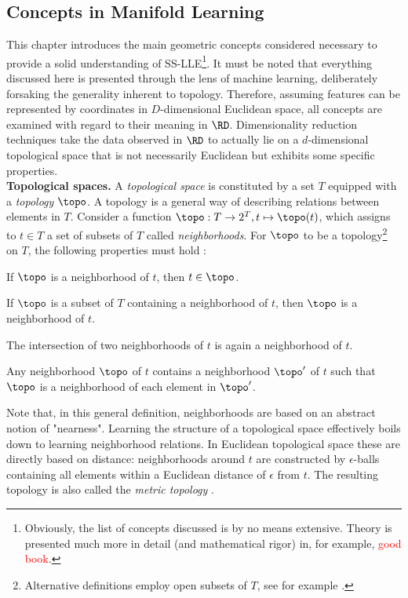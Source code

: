 \subsection{Concepts in Manifold Learning}
\label{mani-concepts}

This chapter introduces the main geometric concepts considered necessary to
provide a solid understanding of SS-LLE\footnote{
Obviously, the list of concepts discussed is by no means extensive. Theory is
presented much more in detail (and mathematical rigor) in, for example, 
\textcolor{red}{good book}.
}.
It must be noted that everything discussed here is presented through the lens of
machine learning, deliberately forsaking the generality inherent to topology.
Therefore, assuming features can be represented by coordinates in 
$D$-dimensional Euclidean space, all concepts are examined with regard to their
meaning in $\RD$.
Dimensionality reduction techniques take the data observed in $\RD$ to actually
lie on a $d$-dimensional topological space that is not necessarily Euclidean but
exhibits some specific properties.
\\


\textbf{Topological spaces.} A \textit{topological space} is constituted by a 
set $T$ equipped with a \textit{topology} $\topo$. 
A topology is a general way of describing relations between elements in $T$.
Consider a function $\topo: T \rightarrow 2^T, t \mapsto \topo(t)$, which 
assigns to $t \in T$ a set of subsets of $T$ called \textit{neighborhoods}.
For $\topo$ to be a topology\footnote{
Alternative definitions employ open subsets of $T$, see for example 
\citet{waldmann2014}.
}
on $T$, the following properties must hold \citep{brown2006}:
\begin{tight_enumerate}
  \item If $\topo$ is a neighborhood of $t$, then $t \in \topo$.
  \item If $\topo$ is a subset of $T$ containing a neighborhood of $t$, then 
  $\topo$ is a neighborhood of $t$.
  \item The intersection of two neighborhoods of $t$ is again a neighborhood of
  $t$.
  \item Any neighborhood $\topo$ of $t$ contains a neighborhood $\topo^{\prime}$ 
  of $t$ such that $\topo$ is a neighborhood of each element in 
  $\topo^{\prime}$.
\end{tight_enumerate}

Note that, in this general definition, neighborhoods are based on an abstract
notion of "nearness". 
Learning the structure of a topological space effectively boils down to learning 
neighborhood relations.
In Euclidean topological space these are directly based on distance: 
neighborhoods around $t$ are constructed by $\epsilon$-balls containing all 
elements within a Euclidean distance of $\epsilon$ from $t$. 
The resulting topology is also called the \textit{metric topology} 
\citep{mccleary2006}.

